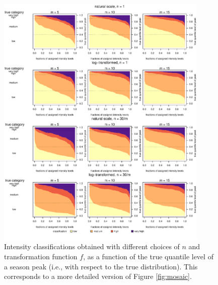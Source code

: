 \documentclass{article}
\begin{document}
\begin{figure}[h!]
\includegraphics[width=0.9\textwidth]{figure/mosaic_fr_fancy.pdf}
\caption{Intensity classifications obtained with different choices of $n$ and transformation function $f$, as a function of the true quantile level of a season peak (i.e., with respect to the true distribution). This corresponds to a more detailed version of Figure \ref{fig:mosaic}.}
\label{fig:mosaic_fancy}
\end{figure}

\newpage
\end{document}
